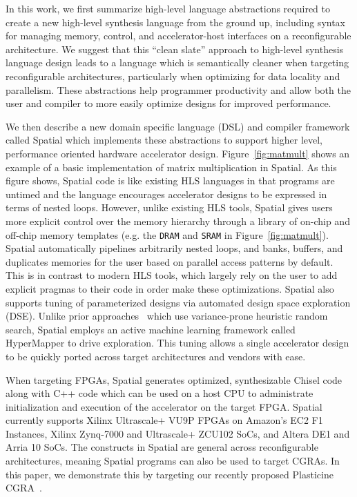 In this work, we first summarize high-level language abstractions required to create a new high-level synthesis language from the ground up, including syntax for managing memory, control, and accelerator-host interfaces on a reconfigurable architecture.
We suggest that this ``clean slate'' approach to high-level synthesis language design leads to a language which is semantically cleaner when targeting reconfigurable architectures, particularly when optimizing for data locality and parallelism. 
These abstractions help programmer productivity and allow both the user and compiler to more easily optimize designs for improved performance. 


We then describe a new domain specific language (DSL) and compiler framework called Spatial which implements these abstractions to support higher level, performance oriented hardware accelerator design. 
Figure~\ref{fig:matmult} shows an example of a basic implementation of matrix multiplication in Spatial.
As this figure shows, Spatial code is like existing HLS languages in that programs are untimed and the language encourages accelerator designs to be expressed in terms of nested loops. However, unlike existing HLS tools, Spatial gives users more explicit control over the memory hierarchy through a library of on-chip and off-chip memory templates (e.g. the \texttt{DRAM} and \texttt{SRAM} in Figure~\ref{fig:matmult}).
Spatial automatically pipelines arbitrarily nested loops, and banks, buffers, and duplicates memories for the user based on parallel access patterns by default. 
This is in contrast to modern HLS tools, which largely rely on the user to add explicit pragmas to their code in order make these optimizations.
Spatial also supports tuning of parameterized designs via automated design space exploration (DSE).
Unlike prior approaches~\cite{dhdl} which use variance-prone heuristic random search, Spatial employs an active machine learning framework called HyperMapper \cite{Bodin2016:PACT16} to drive exploration.
This tuning allows a single accelerator design to be quickly ported across target architectures and vendors with ease.

When targeting FPGAs, Spatial generates optimized, synthesizable Chisel code along with C++ code which can be used on a host CPU to administrate initialization and execution of the accelerator on the target FPGA. 
Spatial currently supports Xilinx Ultrascale+ VU9P FPGAs on Amazon's EC2 F1 Instances, Xilinx Zynq-7000 and Ultrascale+ ZCU102 SoCs, and Altera DE1 and Arria 10 SoCs.
The constructs in Spatial are general across reconfigurable architectures, meaning Spatial programs can also be used to target CGRAs. In this paper, we demonstrate this by targeting our recently proposed Plasticine CGRA~\cite{plasticine}.






